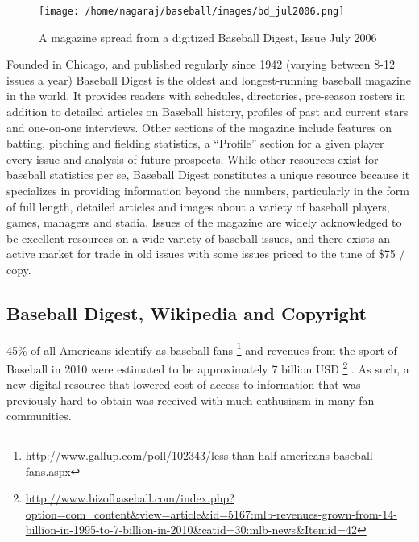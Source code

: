 \documentclass[12pt]{article}
\begin{document}
\begin{figure}[h]
\centering
\texttt{[image: /home/nagaraj/baseball/images/bd\_jul2006.png]}
\caption{A magazine spread from a digitized Baseball Digest, Issue July 2006}
\end{figure}

Founded in Chicago, and published regularly since 1942 (varying between 8-12 issues a year) Baseball Digest is the oldest and longest-running baseball magazine in the world. It provides readers with schedules, directories, pre-season rosters in addition to detailed articles on Baseball history, profiles of past and current stars and one-on-one interviews. Other sections of the magazine include features on batting, pitching and fielding statistics, a ``Profile'' section for a given player every issue and analysis of future prospects. While other resources exist for baseball statistics per se, Baseball Digest constitutes a unique resource because it specializes in providing information beyond the numbers, particularly in the form of full length, detailed articles and images about a variety of baseball players, games, managers and stadia. Issues of the magazine are widely acknowledged to be excellent resources on a wide variety of baseball issues, and there exists an active market for trade in old issues with some issues priced to the tune of \$75 / copy.



\subsection{Baseball Digest, Wikipedia and Copyright}

45\% of all Americans identify as baseball fans \footnote{\url{http://www.gallup.com/poll/102343/less-than-half-americans-baseball-fans.aspx}} and revenues from the sport of Baseball in 2010 were estimated to be approximately 7 billion USD \footnote{\url{http://www.bizofbaseball.com/index.php?option=com_content&view=article&id=5167:mlb-revenues-grown-from-14-billion-in-1995-to-7-billion-in-2010&catid=30:mlb-news&Itemid=42}}
. As such, a new digital resource that lowered cost of access to information that was previously hard to obtain was received with much enthusiasm in many fan communities.
\end{document}
